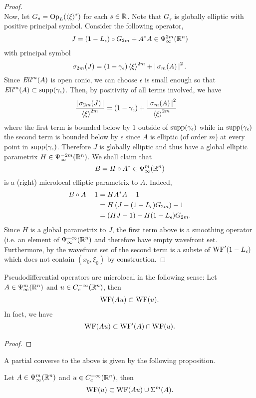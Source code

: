 \documentclass[12pt]{article}
\begin{document}
\begin{proof}
    \\
    Now, let $G_s = \mathrm{Op}_L(\sym[\xi]^s)$ for each $s \in \R$. Note that $G_s$ is globally elliptic with positive principal symbol. Consider the following operator, 
    \begin{align*}
        J = (1 - L_\epsilon) \circ G_{2m} + A^* A \in \Psi^{2m}_\infty(\R^n)
    \end{align*}
    with principal symbol 
    \[
    \sigma_{2m}(J) = (1 - \gamma_\epsilon)\sym[\xi]^{2m} + \abs{\sigma_m(A)}^2. 
    \]
    Since $\Ell^m(A)$ is open conic, we can choose $\epsilon$ is small enough so that $\Ell^{m}(A) \subset \supp(\gamma_\epsilon)$. Then, by positivity of all terms involved, we have
    \begin{align*}
        \frac{\abs{\sigma_{2m}(J)} }{\sym[\xi]^{2m}}
        &= (1 - \gamma_\epsilon) + \frac{\abs{\sigma_m(A)}^2}{\sym[\xi]^{2m}}
    \end{align*}
    where the first term is bounded below by $1$ outside of $\supp(\gamma_\epsilon)$ while in $\supp(\gamma_\epsilon)$ the second term is bounded below by $\epsilon$ since $A$ is elliptic (of order $m$) at every point in $\supp(\gamma_\epsilon)$. Therefore $J$ is globally elliptic and thus have a global elliptic parametrix $H \in \Psi^{-2m}_\infty(\R^n)$. We shall claim that 
    \[
    B = H \circ A^* \in \Psi^m_\infty(\R^n)
    \]
    is a (right) microlocal elliptic parametrix to $A$. Indeed, 
    \begin{align*}
        B \circ A - 1 
        &= H A^*A - 1 \\
        &= H\brac{J - (1 - L_\epsilon)G_{2m}} - 1\\
        &= (HJ - 1) - H(1 - L_\epsilon)G_{2m}. 
    \end{align*}
    Since $H$ is a global parametrix to $J$, the first term above is a smoothing operator (i.e. an element of $\Psi^{-\infty}_\infty(\R^n)$ and therefore have empty wavefront set. Furthermore, by \cite{wavefront of compositiion} the wavefront set of the second term is a subste of $\WF'(1 - L_\epsilon)$ which does not contain $(x_0, \xi_0)$ by construction. 
\end{proof}

\begin{fprop}
    Pseudodifferential operators are microlocal in the following sense: 
    Let $A \in \Psi^m_\infty(\R^n)$ and $u \in C^{-\infty}_c(\R^n)$, then 
    \begin{align}
        \WF(Au) \subset \WF(u). 
    \end{align}
    In fact, we have 
    \begin{align*}
        \WF(Au) \subset \WF'(A) \cap \WF(u). 
    \end{align*}
\end{fprop}
\begin{proof}
    
\end{proof}

A partial converse to the above is given by the following proposition. \\

\begin{fprop}
    Let $A \in \Psi^m_\infty(\R^n)$ and $u \in C^{- \infty}_c(\R^n)$, then 
    \begin{align*}
        \WF(u) \subset \WF(Au) \cup \Char^m(A).
    \end{align*}
\end{fprop}
\end{document}
